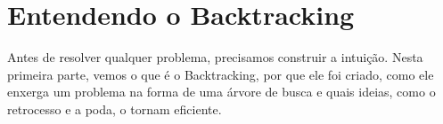 \part{Entendendo o Backtracking}

Antes de resolver qualquer problema, precisamos construir a intuição. Nesta primeira parte, vemos o que é o Backtracking, por que ele foi criado, como ele enxerga um problema na forma de uma árvore de busca e quais ideias, como o retrocesso e a poda, o tornam eficiente.
